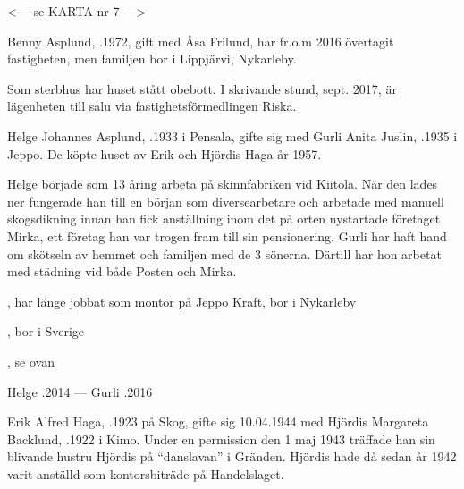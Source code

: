 
<--- se KARTA nr 7 --->





Benny Asplund, .1972, gift med Åsa Frilund, har fr.o.m 2016 övertagit fastigheten, men familjen bor i Lippjärvi, Nykarleby. \jhvspace{}


Som sterbhus har huset stått obebott. I skrivande stund, sept. 2017, är lägenheten till salu via fastighetsförmedlingen Riska. \jhvspace{}



Helge Johannes Asplund, .1933 i Pensala, gifte sig med Gurli Anita Juslin, .1935 i Jeppo. De köpte huset av Erik och Hjördis Haga år 1957.

Helge började som 13 åring arbeta på skinnfabriken vid Kiitola. När den lades ner fungerade han till en början som diversearbetare och arbetade med manuell skogsdikning innan han fick anställning inom det på orten nystartade företaget Mirka, ett företag han var trogen fram till sin pensionering. Gurli har haft hand om skötseln av hemmet och familjen med de 3 sönerna. Därtill har hon arbetat med städning vid både Posten och Mirka.
\begin{jhchildren}
  \item {}, har länge jobbat som montör på Jeppo Kraft, bor i Nykarleby
  \item {}, bor i Sverige
  \item {}, se ovan
\end{jhchildren}

Helge .2014  ---  Gurli .2016


Erik Alfred Haga, .1923 på Skog, gifte sig 10.04.1944 med Hjördis Margareta Backlund, .1922 i Kimo. Under en permission den 1 maj 1943 träffade han sin blivande hustru Hjördis på ``danslavan'' i Gränden. Hjördis hade då sedan år 1942 varit anställd som kontorsbiträde på Handelslaget.


